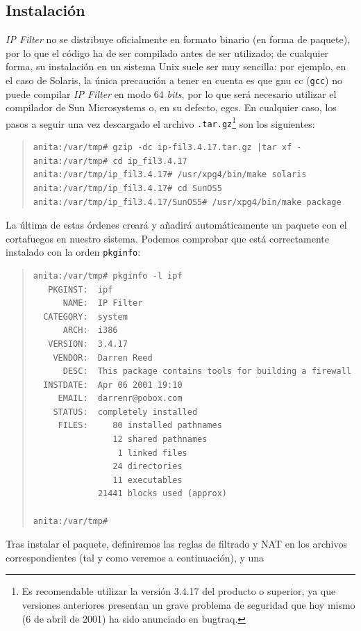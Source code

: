 \subsection{Instalaci\'on}
{\it IP Filter} no se distribuye oficialmente en formato binario (en forma de
paquete), por lo que el c\'odigo ha de ser compilado antes de ser utilizado;
de cualquier forma, su instalaci\'on en un sistema Unix suele ser muy sencilla:
por ejemplo, en el caso de Solaris, la \'unica precauci\'on a tener en cuenta es
que {\sc gnu cc} ({\tt gcc}) no puede compilar {\it IP Filter} en modo 64 {\it
bits}, por lo que ser\'a necesario utilizar el compilador de Sun Microsystems o,
en su defecto, {\sc egcs}. En cualquier caso, los pasos a seguir una vez 
descargado el
archivo {\tt .tar.gz}\footnote{Es recomendable utilizar la versi\'on 3.4.17 del
producto o superior, ya que versiones anteriores presentan un grave problema de
seguridad que hoy mismo (6 de abril de 2001) ha sido anunciado en {\sc 
bugtraq}.} son los siguientes:
\begin{quote}
\begin{verbatim}
anita:/var/tmp# gzip -dc ip-fil3.4.17.tar.gz |tar xf -
anita:/var/tmp# cd ip_fil3.4.17
anita:/var/tmp/ip_fil3.4.17# /usr/xpg4/bin/make solaris
anita:/var/tmp/ip_fil3.4.17# cd SunOS5
anita:/var/tmp/ip_fil3.4.17/SunOS5# /usr/xpg4/bin/make package
\end{verbatim}
\end{quote}
La \'ultima de estas \'ordenes crear\'a y a\~nadir\'a autom\'aticamente un 
paquete con el cortafuegos en nuestro sistema. Podemos comprobar que est\'a
correctamente instalado con la orden {\tt pkginfo}:
\begin{quote}
\begin{verbatim}
anita:/var/tmp# pkginfo -l ipf
   PKGINST:  ipf
      NAME:  IP Filter
  CATEGORY:  system
      ARCH:  i386
   VERSION:  3.4.17
    VENDOR:  Darren Reed
      DESC:  This package contains tools for building a firewall
  INSTDATE:  Apr 06 2001 19:10
     EMAIL:  darrenr@pobox.com
    STATUS:  completely installed
     FILES:     80 installed pathnames
                12 shared pathnames
                 1 linked files
                24 directories
                11 executables
             21441 blocks used (approx)

anita:/var/tmp# 
\end{verbatim}
\end{quote}
Tras instalar el paquete, definiremos las reglas de filtrado y NAT en
los archivos correspondientes (tal y como veremos a continuaci\'on), y una
